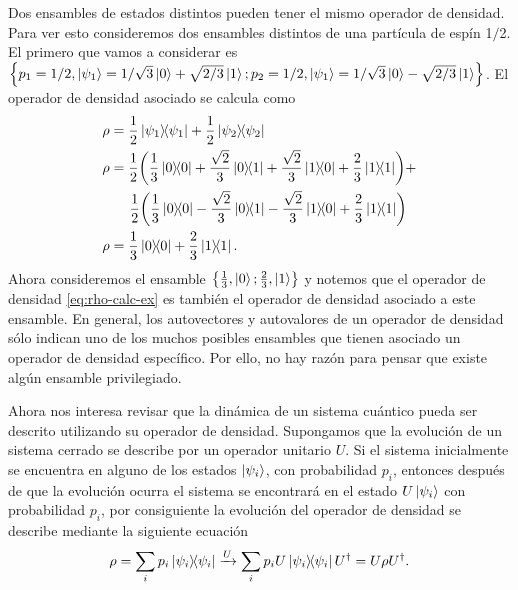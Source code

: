Dos ensambles de estados distintos pueden tener el mismo operador
de densidad. Para ver esto consideremos dos ensambles distintos de 
una partícula de espín 1$/$2. El primero que vamos a considerar es 
$\qty{ p_1=1/2, \ket{\psi_{1} }=1/\sqrt{3}\ket{0}+\sqrt{2/3}\ket{1};
p_2=1/2, \ket{\psi_{1} }=1/\sqrt{3}\ket{0}-\sqrt{2/3}\ket{1}}$. El operador
de densidad asociado se calcula como
\begin{align}
	\rho 	&= \frac{1}{2}\dyad{\psi_1}{\psi_1} + 
	\frac{1}{2}\dyad{\psi_2}{\psi_2} \nonumber \\
	\rho	&= \frac{1}{2}\qty(\frac{1}{3}\dyad{0}{0} +
					 \frac{\sqrt{2}}{3}\dyad{0}{1} + 
					 \frac{\sqrt{2}}{3}\dyad{1}{0} +
					 \frac{2}{3}\dyad{1}{1}) + \nonumber \\
				&\hspace{5mm} \frac{1}{2}\qty(\frac{1}{3}\dyad{0}{0} -
					 \frac{\sqrt{2}}{3}\dyad{0}{1} -
					 \frac{\sqrt{2}}{3}\dyad{1}{0} +
					 \frac{2}{3}\dyad{1}{1}) \nonumber \\
	\rho	&= \frac{1}{3}\dyad{0}{0} + \frac{2}{3}\dyad{1}{1}. 
	\label{eq:rho-calc-ex}
\end{align}
Ahora consideremos el ensamble $\qty{ \frac{1}{3}, \ket{0}; 
\frac{2}{3}, \ket{1}}$ y notemos que el operador de densidad 
\eqref{eq:rho-calc-ex} es también el operador de densidad asociado a
este ensamble. En general, los autovectores y autovalores de un
operador de densidad sólo indican uno de los muchos posibles ensambles
que tienen asociado un operador de densidad específico. Por ello, 
no hay razón para pensar que existe algún ensamble privilegiado.



Ahora nos interesa revisar que la dinámica de un sistema cuántico
pueda ser descrito utilizando su operador de densidad. 
Supongamos que la evolución de un sistema 
cerrado se describe por un operador unitario $U$. 
Si el sistema inicialmente se encuentra en alguno de los estados 
$\ket{\psi_i}$, con probabilidad $p_i$, entonces después de que
la evolución ocurra el sistema se encontrará en el estado $U\ket{\psi_i}$ 
con probabilidad $p_i$, por consiguiente la evolución del operador de densidad
se describe mediante la siguiente ecuación
\begin{align}
	\rho = \sum _ip_i\dyad{\psii}{\psii}
	\xrightarrow[]{U}
	\sum _ip_iU\dyad{\psii}{\psii}U^{\dagger}	=
	U\rho U^{\dagger}.
\end{align}

